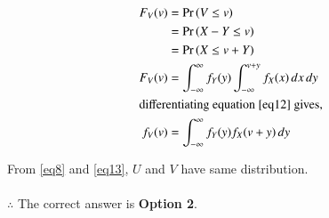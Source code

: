 \documentclass[journal,12pt,twocolumn]{IEEEtran}
\begin{document}
\begin{align}
    F_V(v) &= \Pr\left(V \leq v\right) \\
           &= \Pr\left(X-Y \leq v\right) \\
           &= \Pr\left(X \leq v+Y\right) \\
    F_V(v) &= \int_{-\infty}^{\infty} f_Y(y) \int_{-\infty}^{v+y} f_X(x) \,dx \,dy \label{eq12}\\
\intertext{differentiating equation \eqref{eq12} gives,}
    f_V(v) &= \int_{-\infty}^{\infty} f_Y(y) f_X(v+y) \, dy \label{eq13}
\end{align}

From \eqref{eq8} and \eqref{eq13}, $U$ and $V$ have same distribution.\\\\
$\therefore$  The correct answer is \textbf{Option 2}.
\end{document}
